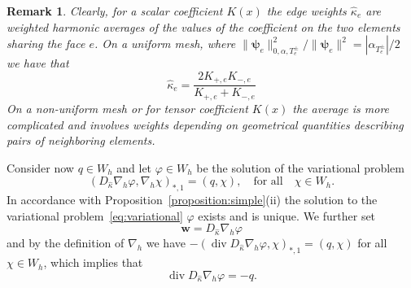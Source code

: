 \documentclass[11pt]{amsart}
\numberwithin{equation}{section}
\newtheorem{remark}{Remark}[section]
\theoremstyle{definition}\newtheorem{example}{Example}[section]
\begin{document}
\begin{remark}
Clearly, for a scalar coefficient $K(x)$ the edge weights $\widehat{\kappa}_e$ are weighted 
harmonic averages of the values of the coefficient on the
two elements sharing the face $e$. On a uniform mesh, where 
$
\| {{\boldsymbol \psi}}_e\|^2_{0,\alpha,T_e^\pm}/\| {{\boldsymbol \psi}}_e\|^2= 
|\alpha_{T_e^{\pm}}|/2$ we have that 
\[
\widehat{\kappa}_e 
=\frac{2K_{+,e}K_{-,e}}{K_{+,e}+K_{-,e}}
\]
On a non-uniform mesh or for tensor coefficient $K(x)$ 
the average is more complicated and involves weights depending
on geometrical quantities describing pairs of neighboring elements. 
\end{remark}

Consider now $q\in W_h$ 
and let $\varphi\in W_h$ be the solution of the variational problem
\begin{equation}\label{eq:variational}
(D_{\widehat{\kappa}}\nabla_h \varphi,\nabla_h \chi)_{*,1} = (q,\chi),\quad \mbox{for all}\quad \chi\in 
W_h. 
\end{equation}
In accordance with Proposition~\ref{proposition:simple}(ii) the
solution to the variational problem~\eqref{eq:variational} 
$\varphi$ exists and is unique. 
We further set 
\begin{equation}\label{eq:def-w}
{{\mathbf w}} = D_{\widehat{\kappa}}\nabla_h \varphi
\end{equation}
and by the definition of $\nabla_h$ we have 
$-({\operatorname{div}} D_{\widehat{\kappa}}\nabla_h 
\varphi,\chi)_{*,1} = (q,\chi)$ for all $\chi\in W_h$, which implies that
\begin{equation}\label{eq:div-w}
{\operatorname{div}} D_{\widehat{\kappa}}\nabla_h\varphi=-q.
\end{equation}
\end{document}
